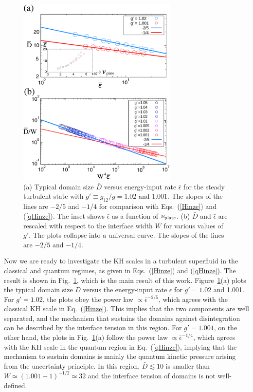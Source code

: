 \documentclass[pra,aps,superscriptaddress,twocolumn]{revtex4-2}
\begin{document}
\begin{figure}[t]
	\includegraphics[width=8cm]{fig3.eps}
	\caption{
		(a) Typical domain size $\bar D$ versus energy-input rate $\bar\epsilon$
    for the steady turbulent state with $g' \equiv g_{12} / g = 1.02$ and
    1.001.
    The slopes of the lines are $-2/5$ and $-1/4$ for comparison with
    Eqs.~(\ref{Hinze}) and (\ref{qHinze}).
    The inset shows $\bar\epsilon$ as a function of $\nu_{\rm plate}$.
    (b) $\bar D$ and $\bar\epsilon$ are rescaled with respect to the
    interface width $W$ for various values of $g'$.
    The plots collapse into a universal curve.
    The slopes of the lines are $-2/5$ and $-1/4$.
	}
	\label{f:hinze}
\end{figure}
Now we are ready to investigate the KH scales in a turbulent superfluid in
the classical and quantum regimes, as given in Eqs.~(\ref{Hinze}) and
(\ref{qHinze}).
The result is shown in Fig.~\ref{f:hinze}, which is the main result of this
work.
Figure~\ref{f:hinze}(a) plots the typical domain size $\bar D$ versus the
energy-input rate $\bar\epsilon$ for $g' = 1.02$ and 1.001.
For $g' = 1.02$, the plots obey the power law $\propto \bar\epsilon^{-2/5}$,
which agrees with the classical KH scale in Eq.~(\ref{Hinze}).
This implies that the two components are well separated, and the mechanism
that sustains the domains against disintegration can be described by the
interface tension in this region.
For $g' = 1.001$, on the other hand, the plots in
Fig.~\ref{f:hinze}(a) follow the power law $\propto \bar\epsilon^{-1/4}$,
which agrees with the KH scale in the quantum region in Eq.~(\ref{qHinze}),
implying that the mechanism to sustain domains is mainly the quantum
kinetic pressure arising from the uncertainty principle.
In this region, $\bar D \lesssim 10$ is smaller than
$W \simeq (1.001 - 1)^{-1/2} \simeq 32$ and the interface tension of domains
is not well-defined.
\end{document}

